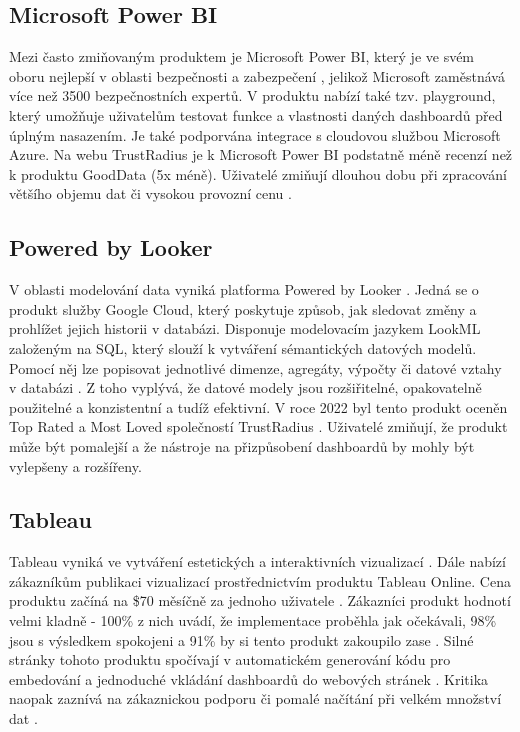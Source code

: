 \documentclass[czech, bc, kiv, he, iso690numb]{fasthesis}
\begin{document}
\subsection{Microsoft Power BI}
Mezi často zmiňovaným produktem je Microsoft Power BI, který je ve svém oboru nejlepší v oblasti bezpečnosti a zabezpečení \cite{bestEmbTools2023},
jelikož Microsoft zaměstnává více než 3500 bezpečnostních expertů. V produktu nabízí také tzv. playground, který
umožňuje uživatelům testovat funkce a vlastnosti daných dashboardů před úplným nasazením. Je také podporvána integrace s cloudovou službou Microsoft Azure. Na webu TrustRadius je k 
Microsoft Power BI podstatně méně recenzí než k produktu GoodData (5x méně). Uživatelé zmiňují dlouhou dobu při zpracování většího objemu dat či vysokou provozní cenu \cite{trustRadiusDiscusionAzure}.

\subsection{Powered by Looker}
V oblasti modelování data vyniká platforma Powered by Looker \cite{bestEmbTools2023}. Jedná se o produkt služby Google Cloud, který poskytuje způsob, jak sledovat změny a prohlížet jejich
historii v databázi. Disponuje modelovacím jazykem LookML založeným na SQL, který slouží k vytváření sémantických datových modelů. Pomocí něj lze popisovat jednotlivé dimenze, agregáty,
výpočty či datové vztahy v databázi \cite{googleLookMLDoc}. Z toho vyplývá, že datové modely jsou rozšiřitelné, opakovatelně použitelné a konzistentní a tudíž efektivní. V roce 2022 byl tento produkt
oceněn Top Rated a Most Loved společností TrustRadius \cite{trustRadiusDiscusionLooker}. Uživatelé zmiňují, že produkt může být pomalejší a že nástroje na přizpůsobení dashboardů by mohly být
vylepšeny a rozšířeny.


\subsection{Tableau}
Tableau vyniká ve vytváření estetických a interaktivních vizualizací \cite{tableauBlog}. Dále nabízí zákazníkům publikaci vizualizací prostřednictvím produktu Tableau Online. Cena produktu začíná na \$70 měsíčně za jednoho uživatele \cite{trustRadiusTableAU}. 
Zákazníci produkt hodnotí velmi kladně - 100\% z nich uvádí, že implementace proběhla jak očekávali, 98\% jsou s výsledkem spokojeni a 91\% by si tento produkt zakoupilo zase \cite{trustRadiusTableAU}. Silné stránky 
tohoto produktu spočívají v automatickém generování kódu pro embedování a jednoduché vkládání dashboardů do webových stránek \cite{tableauBlog}. Kritika naopak zaznívá na zákaznickou podporu či pomalé načítání při velkém množství dat \cite{trustRadiusTableAU}.
\end{document}
